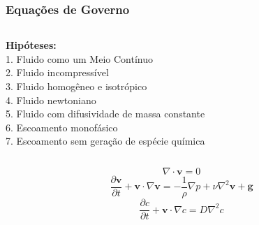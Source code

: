 \begin{frame} 
 \frametitle{\Large Equações de Governo}
\vspace{-1cm}
\begin{center}
\begin{columns}[c]
\begin{column}{0.8\textwidth} 
\hspace{1cm} \textbf{Hipóteses:}\\[0.2cm] 
\hspace{1cm}  1. Fluido como um Meio Contínuo\\[0.1cm]
\hspace{1cm}  2. Fluido incompressível\\[0.1cm]
\hspace{1cm}  3. Fluido homogêneo e isotrópico\\[0.1cm]
\hspace{1cm}  4. Fluido newtoniano\\[0.1cm]
\hspace{1cm}  5. Fluido com difusividade de massa constante\\[0.1cm]
\hspace{1cm}  6. Escoamento monofásico\\[0.1cm]
\hspace{1cm}  7. Escoamento sem geração de espécie química
\end{column}
\begin{column}{0.5\textwidth}
\end{column}
\end{columns}
\end{center}
\small
\vspace{0cm}
\begin{equation*}
 \nabla \cdot \textbf{v}
 = 0 
\end{equation*}
\vspace{-0.3cm}
\begin{equation*}
 \frac{\partial \textbf{v}}{\partial t} + \textbf{v} \cdot \nabla \textbf{v}
 =
 -
 \frac{1}{\rho} \nabla p
 +
 \nu \nabla^{2} \textbf{v}
 +
 \textbf{g}
\end{equation*}
\vspace{-0.3cm}
\begin{equation*}
 \frac{\partial c}{\partial t}
 +
 \textbf{v} \cdot \nabla c
 =
 D \nabla^{2} c
\end{equation*}
\end{frame}


